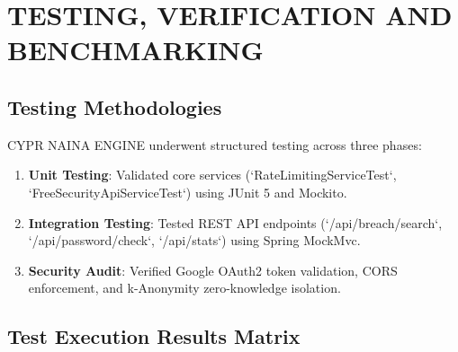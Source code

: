 \documentclass[12pt,a4paper,oneside]{report}
\begin{document}
\chapter{TESTING, VERIFICATION AND BENCHMARKING}

\section{Testing Methodologies}

CYPR NAINA ENGINE underwent structured testing across three phases:

\begin{enumerate}
    \item \textbf{Unit Testing}: Validated core services (`RateLimitingServiceTest`, `FreeSecurityApiServiceTest`) using JUnit 5 and Mockito.
    \item \textbf{Integration Testing}: Tested REST API endpoints (`/api/breach/search`, `/api/password/check`, `/api/stats`) using Spring MockMvc.
    \item \textbf{Security Audit}: Verified Google OAuth2 token validation, CORS enforcement, and k-Anonymity zero-knowledge isolation.
\end{enumerate}

\section{Test Execution Results Matrix}
\end{document}
